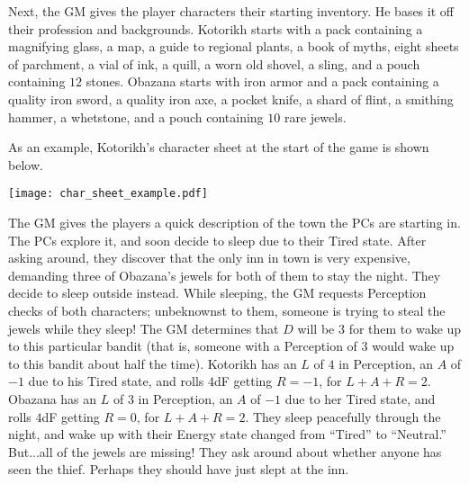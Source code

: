 \begin{example}
Next, the GM gives the player characters their starting inventory.
He bases it off their profession and backgrounds.
Kotorikh starts with a pack containing a magnifying glass, a map, a guide to regional plants, a book of myths, eight sheets of parchment, a vial of ink, a quill,
a worn old shovel, a sling, and a pouch containing $12$ stones.
Obazana starts with iron armor and a pack containing a quality iron sword, a quality iron axe, a pocket knife, a shard of flint, a smithing hammer, a whetstone,
and a pouch containing $10$ rare jewels.

As an example, Kotorikh’s character sheet at the start of the game is shown below.

\begin{center}
\texttt{[image: char\_sheet\_example.pdf]}
\end{center}

The GM gives the players a quick description of the town the PCs are starting in.
The PCs explore it, and soon decide to sleep due to their Tired state.
After asking around, they discover that the only inn in town is very expensive, demanding three of Obazana’s jewels for both of them to stay the night.
They decide to sleep outside instead.
While sleeping, the GM requests Perception checks of both characters; unbeknownst to them, someone is trying to steal the jewels while they sleep!
The GM determines that $D$ will be $3$ for them to wake up to this particular bandit (that is, someone with a Perception of $3$ would wake up to this bandit about half the time).
Kotorikh has an $L$ of $4$ in Perception, an $A$ of $-1$ due to his Tired state, and rolls $4$dF getting $R = -1$, for $L+A+R = 2$.
Obazana has an $L$ of $3$ in Perception, an $A$ of $-1$ due to her Tired state, and rolls $4$dF getting $R = 0$, for $L+A+R = 2$.
They sleep peacefully through the night, and wake up with their Energy state changed from “Tired” to “Neutral.” But...all of the jewels are missing!
They ask around about whether anyone has seen the thief.
Perhaps they should have just slept at the inn.

\end{example}


